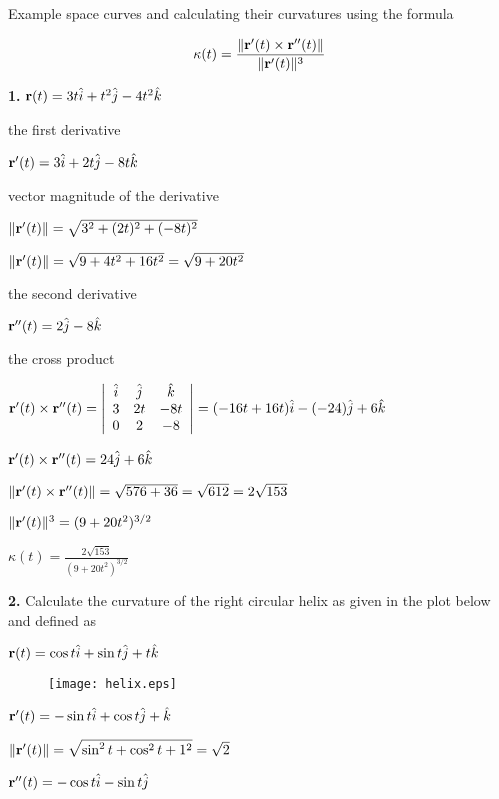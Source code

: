 \documentclass[12pt]{article}
\begin{document}
Example space curves and calculating their curvatures using the formula

$$\kappa(t) =\frac{\Vert {\bf r}'(t)\times {\bf r}''(t)\Vert}{ \Vert {\bf r}'(t)\Vert^3}$$


{\bf 1.}  ${\bf r}(t) = 3t \hat{i} + t^2\hat{j} - 4t^2\hat{k}$

the first derivative

${\bf r}'(t) = 3 \hat{i} + 2t\hat{j} - 8t\hat{k}$

vector magnitude of the derivative

$\Vert {\bf r}'(t)\Vert = \sqrt{ 3^2 + (2t)^2 + (-8t)^2}$

$\Vert {\bf r}'(t)\Vert = \sqrt{ 9 + 4t^2 + 16t^2} = \sqrt{9 + 20 t^2}$

the second derivative

${\bf r}''(t) = 2 \hat{j} - 8 \hat{k}$

the cross product 

${\bf r}'(t)\times {\bf r}''(t) = \left|
\begin{array}{ccc}
\hat{i} & \hat{j} & \hat{k} \\
3 & 2t & -8t \\
0 & 2 & -8 \\
\end{array}\right| = (-16t + 16t)\hat{i} - (-24)\hat{j} + 6\hat{k}$


${\bf r}'(t)\times {\bf r}''(t) = 24\hat{j} + 6\hat{k}$

$\Vert {\bf r}'(t)\times {\bf r}''(t) \Vert = \sqrt{576 + 36} = \sqrt{612} = 2\sqrt{153}$

$\Vert {\bf r}'(t)\Vert^3 = (9 + 20t^2)^{3/2}$

$\kappa(t) = \frac{2\sqrt{153}}{(9 + 20t^2)^{3/2}}$

{\bf 2.} Calculate the curvature of the right circular helix as given in the plot below and defined as 

${\bf r}(t) = \cos t \hat{i} + \sin t \hat{j} + t\hat{k}$

\begin{figure}
\texttt{[image: helix.eps]}
\vspace{10 pt}
\end{figure}

${\bf r}'(t) = -\sin t \hat{i} + \cos t\hat{j} + \hat{k}$

$\Vert {\bf r}'(t)\Vert = \sqrt{ \sin^2 t + \cos^2 t + 1^2} = \sqrt{2}$

${\bf r}''(t) = -\cos t \hat{i} -\sin t \hat{j}$
\end{document}
